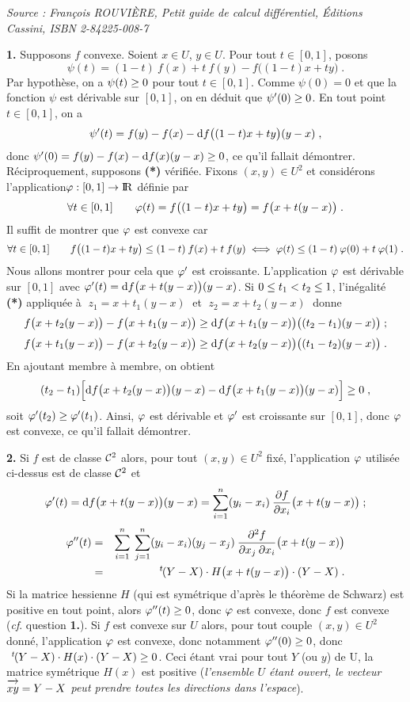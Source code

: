 \documentclass{article}
\begin{document}
\ssk

{\it Source : Fran\c cois ROUVI\`ERE, Petit guide de calcul diff\'erentiel, \'Editions Cassini, ISBN 2-84225-008-7}


\ssk
\cl{- - - - - - - - - - - - - - - - - - - - - - - - - - - - - - - }
\msk

{\bf 1.} Supposons $f$ convexe. Soient $x\in U$, $y\in U$. Pour tout $t\in[0,1]$, posons\vv
$$\psi(t)=(1-t)\>f(x)+t\>f(y)-f\big((1-t)x+ty\big)\;.$$
Par hypoth\`ese, on a $\psi(t)\geq0$ pour tout $t\in[0,1]$. Comme $\psi(0)=0$ et que la fonction $\psi$ est d\'erivable sur $[0,1]$, on en d\'eduit que $\psi'(0)\geq0$. En tout point $t\in[0,1]$, on a\vv
$$\psi'(t)=f(y)-f(x)-{\rm d}f\big((1-t)x+ty\big)(y-x)\;,$$
donc $\psi'(0)=f(y)-f(x)-{\rm d}f(x)(y-x)\geq0$, ce qu'il fallait d\'emontrer.
\msk\sect
R\'eciproquement, supposons {\bf (*)} v\'erifi\'ee. Fixons $(x,y)\in U^2$ et consid\'erons l'application\break $\varphi:[0,1]\rightarrow{\rm I\kern-0.6mm R}$ d\'efinie par\vv
$$\forall t\in[0,1]\qquad \varphi(t)=f\big((1-t)x+ty\big)=f\big(x+t(y-x)\big)\;.$$
Il suffit de montrer que $\varphi$ est convexe car\vvvv
$$\forall t\in[0,1]\qquad f\big((1-t)x+ty\big)\leq(1-t)\>f(x)+t\>f(y)\iff\varphi(t)\leq(1-t)\>\varphi(0)+t\>\varphi(1)\;.$$
Nous allons montrer pour cela que $\varphi'$ est croissante. L'application $\varphi$ est d\'erivable sur $[0,1]$ avec $\varphi'(t)={\rm d}f\big(x+t(y-x)\big)(y-x)$. Si $0\leq t_1<t_2\leq1$, l'in\'egalit\'e {\bf (*)} appliqu\'ee \`a $\;z_1=x+t_1(y-x)\;$ et $\;z_2=x+t_2(y-x)\;$ donne\vv
$$f\big(x+t_2(y-x)\big)-f\big(x+t_1(y-x)\big)\geq{\rm d}f\big(x+t_1(y-x)\big)\big((t_2-t_1)(y-x)\big)\;;$$
$$f\big(x+t_1(y-x)\big)-f\big(x+t_2(y-x)\big)\geq{\rm d}f\big(x+t_2(y-x)\big)\big((t_1-t_2)(y-x)\big)\;.$$
En ajoutant membre \`a membre, on obtient\vv
$$(t_2-t_1)\Big[{\rm d}f\big(x+t_2(y-x)\big)(y-x)-{\rm d}f\big(x+t_1(y-x)\big)(y-x)\Big]\geq0\;,$$
soit $\varphi'(t_2)\geq\varphi'(t_1)$. Ainsi, $\varphi$ est d\'erivable et $\varphi'$ est croissante sur $[0,1]$, donc $\varphi$ est convexe, ce qu'il fallait d\'emontrer.

\msk
{\bf 2.} Si $f$ est de classe ${\cal C}^2$ alors, pour tout $(x,y)\in U^2$ fix\'e, l'application $\varphi$ utilis\'ee ci-dessus est de classe ${\cal C}^2$ et\vvvv
$$\varphi'(t)={\rm d}f\big(x+t(y-x)\big)(y-x)=\sum_{i=1}^n(y_i-x_i)\>{\partial f\over\partial x_i}\big(x+t(y-x)\big)\;;$$\vvv
\begin{eqnarray*}
\varphi''(t) & = & \sum_{i=1}^n\>\sum_{j=1}^n(y_i-x_i)(y_j-x_j)\>{\partial^2f\over\partial x_j\>\partial x_i}\big(x+t(y-x)\big)\\
& = & \,{}^t\!\!\>(Y-X)\cdot H\big(x+t(y-x)\big)\cdot(Y-X)\;.
\end{eqnarray*}\sect
Si la matrice hessienne $H$ (qui est sym\'etrique d'apr\`es le th\'eor\`eme de Schwarz) est positive en tout point, alors $\varphi''(t)\geq0$, donc $\varphi$ est convexe, donc $f$ est convexe ({\it cf}. question {\bf 1.}).\msk\sect
Si $f$ est convexe sur $U$ alors, pour tout couple $(x,y)\in U^2$ donn\'e, l'application $\varphi$ est convexe, donc notamment $\varphi''(0)\geq0$, donc $\;\,{}^t\!\!\>(Y-X)\cdot H(x)\cdot(Y-X)\geq0$. Ceci \'etant vrai pour tout $Y$ (ou $y$) de U, la matrice sym\'etrique $H(x)$ est positive ({\it l'ensemble $U$ \'etant ouvert, le vecteur $\vect{xy}=Y-X$ peut prendre toutes les directions dans l'espace}).
\end{document}
